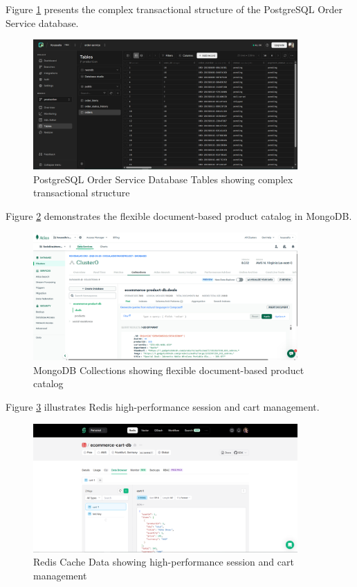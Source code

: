Figure \ref{fig:postgresql-order-tables} presents the complex transactional structure of the PostgreSQL Order Service database.

\begin{figure}[H]
\centering
\includegraphics[width=0.9\textwidth]{figures/chapter5/postgresql-database-order-tables.png}
\caption{PostgreSQL Order Service Database Tables showing complex transactional structure}
\label{fig:postgresql-order-tables}
\end{figure}

Figure \ref{fig:mongodb-collections} demonstrates the flexible document-based product catalog in MongoDB.

\begin{figure}[H]
\centering
\includegraphics[width=0.9\textwidth]{figures/chapter5/mongodb-collections.png}
\caption{MongoDB Collections showing flexible document-based product catalog}
\label{fig:mongodb-collections}
\end{figure}

Figure \ref{fig:redis-cache-data} illustrates Redis high-performance session and cart management.

\begin{figure}[H]
\centering
\includegraphics[width=0.9\textwidth]{figures/chapter5/redis-cache-data.png}
\caption{Redis Cache Data showing high-performance session and cart management}
\label{fig:redis-cache-data}
\end{figure}


